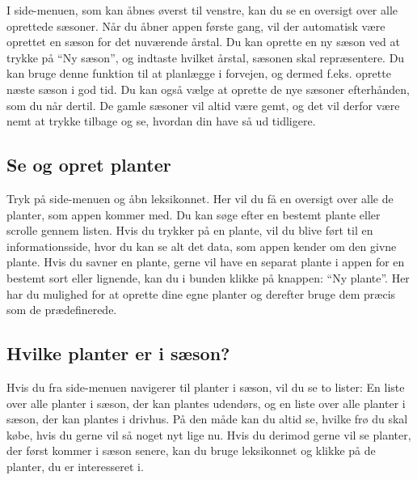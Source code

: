 \begin{minipage}{0.55\textwidth}
I side-menuen, som kan åbnes øverst til venstre, kan du se en oversigt over alle oprettede sæsoner. Når du åbner appen første gang, vil der automatisk være oprettet en sæson for det nuværende årstal. Du kan oprette en ny sæson ved at trykke på ``Ny sæson'', og indtaste hvilket årstal, sæsonen skal repræsentere. Du kan bruge denne funktion til at planlægge i forvejen, og dermed f.eks. oprette næste sæson i god tid. Du kan også vælge at oprette de nye sæsoner efterhånden, som du når dertil. De gamle sæsoner vil altid være gemt, og det vil derfor være nemt at trykke tilbage og se, hvordan din have så ud tidligere.
\end{minipage} 

\subsection{Se og opret planter}
Tryk på side-menuen og åbn leksikonnet. Her vil du få en oversigt over alle de planter, som appen kommer med. Du kan søge efter en bestemt plante eller scrolle gennem listen. Hvis du trykker på en plante, vil du blive ført til en informationsside, hvor du kan se alt det data, som appen kender om den givne plante. Hvis du savner en plante, gerne vil have en separat plante i appen for en bestemt sort eller lignende, kan du i bunden klikke på knappen: ``Ny plante''. Her har du mulighed for at oprette dine egne planter og derefter bruge dem præcis som de prædefinerede.

\subsection{Hvilke planter er i sæson?}
Hvis du fra side-menuen navigerer til planter i sæson, vil du se to lister: En liste over alle planter i sæson, der kan plantes udendørs, og en liste over alle planter i sæson, der kan plantes i drivhus. På den måde kan du altid se, hvilke frø du skal købe, hvis du gerne vil så noget nyt lige nu. 
Hvis du derimod gerne vil se planter, der først kommer i sæson senere, kan du bruge leksikonnet og klikke på de planter, du er interesseret i.

